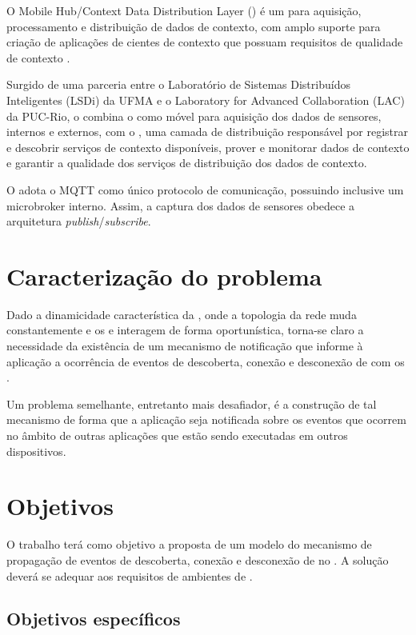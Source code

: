 O Mobile Hub/Context Data Distribution Layer (\mhubcddl) é um \middleware \iot para aquisição, processamento e distribuição de dados de contexto, com amplo suporte para criação de aplicações de \iot cientes de contexto que possuam requisitos de qualidade de contexto \cite{gomes:et-al:2017}.

Surgido de uma parceria entre o Laboratório de Sistemas Distribuídos Inteligentes (LSDi) da UFMA e o Laboratory for Advanced Collaboration (LAC) da PUC-Rio, o \middleware combina o \mhub \cite{talavera:et-al:2015} como \gateway móvel para aquisição dos dados de sensores, internos e externos, com o \cddl, uma camada de distribuição responsável por registrar e descobrir serviços de contexto disponíveis, prover e monitorar dados de contexto e garantir a qualidade dos serviços de distribuição dos dados de contexto.

O \mhubcddl adota o MQTT como único protocolo de comunicação, possuindo inclusive um microbroker interno. Assim, a captura dos dados de sensores obedece a arquitetura \textit{publish}/\textit{subscribe}.

\section{Caracterização do problema}

Dado a dinamicidade característica da \iomt, onde a topologia da rede muda constantemente e os \smartobjs e \gateways interagem de forma oportunística, torna-se claro a necessidade da existência de um mecanismo de notificação que informe à aplicação a ocorrência de eventos de descoberta, conexão e desconexão de \smartobjs com os \smartphones.

Um problema semelhante, entretanto mais desafiador, é a construção de tal mecanismo de forma que a aplicação seja notificada sobre os eventos que ocorrem no âmbito de outras aplicações que estão sendo executadas em outros dispositivos.

\section{Objetivos}

O trabalho terá como objetivo a proposta de um modelo do mecanismo de propagação de eventos de descoberta, conexão e desconexão de \smartobjs no \middleware \mhubcddl. A solução deverá se adequar aos requisitos de ambientes de \iomt.

\subsection{Objetivos específicos}

